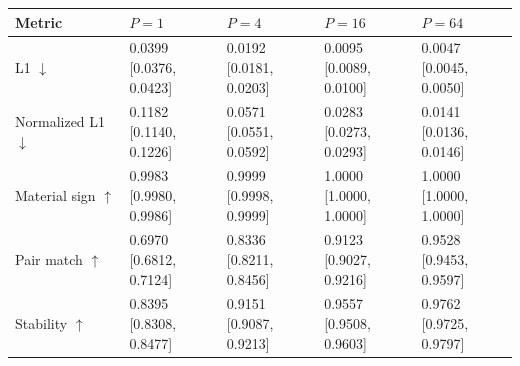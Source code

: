 \begingroup\footnotesize
\begin{tabular}{lllll}
\toprule
Metric & $P=1$ & $P=4$ & $P=16$ & $P=64$ \\
\midrule
L1 $\downarrow$ & \shortstack{0.0399\\{[0.0376, 0.0423]}} & \shortstack{0.0192\\{[0.0181, 0.0203]}} & \shortstack{0.0095\\{[0.0089, 0.0100]}} & \shortstack{0.0047\\{[0.0045, 0.0050]}} \\
Normalized L1 $\downarrow$ & \shortstack{0.1182\\{[0.1140, 0.1226]}} & \shortstack{0.0571\\{[0.0551, 0.0592]}} & \shortstack{0.0283\\{[0.0273, 0.0293]}} & \shortstack{0.0141\\{[0.0136, 0.0146]}} \\
Material sign $\uparrow$ & \shortstack{0.9983\\{[0.9980, 0.9986]}} & \shortstack{0.9999\\{[0.9998, 0.9999]}} & \shortstack{1.0000\\{[1.0000, 1.0000]}} & \shortstack{1.0000\\{[1.0000, 1.0000]}} \\
Pair match $\uparrow$ & \shortstack{0.6970\\{[0.6812, 0.7124]}} & \shortstack{0.8336\\{[0.8211, 0.8456]}} & \shortstack{0.9123\\{[0.9027, 0.9216]}} & \shortstack{0.9528\\{[0.9453, 0.9597]}} \\
Stability $\uparrow$ & \shortstack{0.8395\\{[0.8308, 0.8477]}} & \shortstack{0.9151\\{[0.9087, 0.9213]}} & \shortstack{0.9557\\{[0.9508, 0.9603]}} & \shortstack{0.9762\\{[0.9725, 0.9797]}} \\
\bottomrule
\end{tabular}
\endgroup
